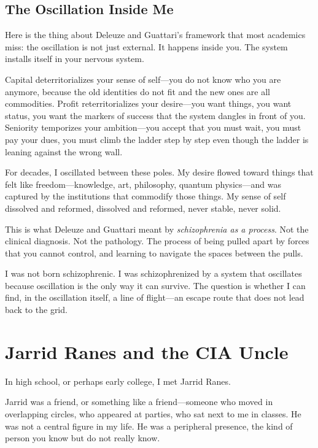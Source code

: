 \documentclass[11pt,openany]{book}
\begin{document}
\section*{The Oscillation Inside Me}

Here is the thing about Deleuze and Guattari's framework that most academics miss: the oscillation is not just external. It happens inside you. The system installs itself in your nervous system.

Capital deterritorializes your sense of self---you do not know who you are anymore, because the old identities do not fit and the new ones are all commodities. Profit reterritorializes your desire---you want things, you want status, you want the markers of success that the system dangles in front of you. Seniority temporizes your ambition---you accept that you must wait, you must pay your dues, you must climb the ladder step by step even though the ladder is leaning against the wrong wall.

For decades, I oscillated between these poles. My desire flowed toward things that felt like freedom---knowledge, art, philosophy, quantum physics---and was captured by the institutions that commodify those things. My sense of self dissolved and reformed, dissolved and reformed, never stable, never solid.

This is what Deleuze and Guattari meant by \textit{schizophrenia as a process}. Not the clinical diagnosis. Not the pathology. The process of being pulled apart by forces that you cannot control, and learning to navigate the spaces between the pulls.

I was not born schizophrenic. I was schizophrenized by a system that oscillates because oscillation is the only way it can survive. The question is whether I can find, in the oscillation itself, a line of flight---an escape route that does not lead back to the grid.

\chapter{Jarrid Ranes and the CIA Uncle}

In high school, or perhaps early college, I met Jarrid Ranes.

Jarrid was a friend, or something like a friend---someone who moved in overlapping circles, who appeared at parties, who sat next to me in classes. He was not a central figure in my life. He was a peripheral presence, the kind of person you know but do not really know.
\end{document}
